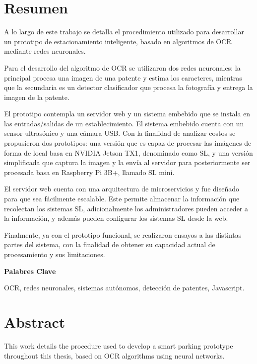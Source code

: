 \chapter*{Resumen}

A lo largo de este trabajo se detalla el procedimiento utilizado para desarrollar un prototipo de estacionamiento inteligente, basado en algoritmos de OCR mediante redes neuronales.

Para el desarrollo del algoritmo de OCR se utilizaron dos redes neuronales: la principal procesa una imagen de una patente y estima los caracteres,
mientras que la secundaria es un detector clasificador que procesa la fotografía y entrega la imagen de la patente.

El prototipo contempla un servidor web y un sistema embebido que se instala en las entradas/salidas de un establecimiento.
El sistema embebido cuenta con un sensor ultrasónico y una cámara USB.
Con la finalidad de analizar costos se propusieron dos prototipos: una versión que es capaz de procesar las imágenes de forma de local basa en NVIDIA Jetson TX1, denominado como SL, y una versión simplificada que captura la imagen y la envía al servidor para posteriormente ser procesada basa en Raspberry Pi 3B+, llamado SL mini.

El servidor web cuenta con una arquitectura de microservicios y fue diseñado para que sea fácilmente escalable. Este permite almacenar la información que recolectan los sistemas SL, adicionalmente los administradores pueden acceder a la información, y además pueden configurar los sistemas SL desde la web.

Finalmente, ya con el prototipo funcional, se realizaron ensayos a las distintas partes del sistema, con la finalidad de obtener su capacidad actual de procesamiento y sus limitaciones.

\vspace*{\fill}
\noindent \textbf{Palabres Clave}

OCR, redes neuronales, sistemas autónomos, detección de patentes, Javascript.

\chapter*{Abstract}

This work details the procedure used to develop a smart parking prototype throughout this thesis, based on OCR algorithms using neural networks.

